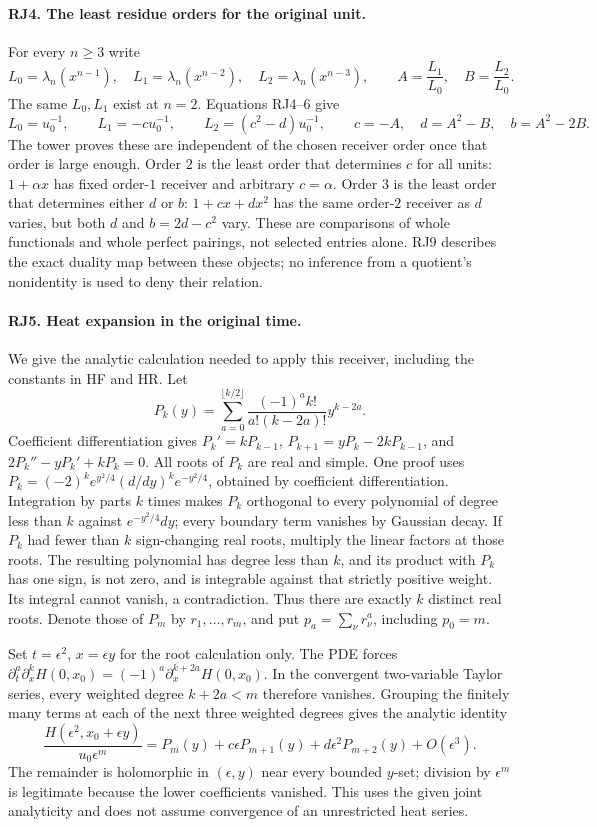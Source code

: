 \documentclass[11pt,a4paper]{article}
\theoremstyle{definition}\newtheorem{definition}[theorem]{Definition}
\begin{document}
\paragraph{RJ4. The least residue orders for the original unit.}
For every $n\ge3$ write
\[
 L_0=\lambda_n(x^{n-1}),\quad L_1=\lambda_n(x^{n-2}),\quad
 L_2=\lambda_n(x^{n-3}),\qquad A=\frac{L_1}{L_0},\quad
 B=\frac{L_2}{L_0}.
 \tag{RJ10}
\]
The same $L_0,L_1$ exist at $n=2$. Equations RJ4--6 give
\[
 L_0=u_0^{-1},\qquad L_1=-cu_0^{-1},\qquad
 L_2=(c^2-d)u_0^{-1},
 \qquad\boxed{c=-A,\quad d=A^2-B,\quad b=A^2-2B.}
 \tag{RJ11}
\]
The tower proves these are independent of the chosen receiver order
once that order is large enough. Order $2$ is the least order that
determines $c$ for all units: $1+\alpha x$ has fixed order-$1$
receiver and arbitrary $c=\alpha$. Order $3$ is the least order
that determines either $d$ or $b$: $1+c x+d x^2$ has the same
order-$2$ receiver as $d$ varies, but both $d$ and $b=2d-c^2$
vary. These are comparisons of whole functionals and whole perfect
pairings, not selected entries alone. RJ9 describes the exact
duality map between these objects; no inference from a quotient's
nonidentity is used to deny their relation.

\paragraph{RJ5. Heat expansion in the original time.}
We give the analytic calculation needed to apply this receiver,
including the constants in HF and HR. Let
\[
 P_k(y)=\sum_{a=0}^{\lfloor k/2\rfloor}
       \frac{(-1)^ak!}{a!(k-2a)!}y^{k-2a}.
 \tag{RJ12}
\]
Coefficient differentiation gives
$P_k'=kP_{k-1}$,
$P_{k+1}=yP_k-2kP_{k-1}$, and
$2P_k''-yP_k'+kP_k=0$.
All roots of $P_k$ are real and simple. One proof uses
$P_k=(-2)^ke^{y^2/4}(d/dy)^ke^{-y^2/4}$, obtained by coefficient
differentiation. Integration by parts $k$ times makes $P_k$
orthogonal to every polynomial of degree less than $k$ against
$e^{-y^2/4}dy$; every boundary term vanishes by Gaussian decay.
If $P_k$ had fewer than $k$ sign-changing real roots, multiply the
linear factors at those roots. The resulting polynomial has degree
less than $k$, and its product with $P_k$ has one sign, is not zero,
and is integrable against that strictly positive weight. Its integral
cannot vanish, a contradiction. Thus there are exactly $k$ distinct
real roots. Denote those of $P_m$ by $r_1,\ldots,r_m$, and put
$p_a=\sum_\nu r_\nu^a$, including $p_0=m$.

Set $t=\epsilon^2$, $x=\epsilon y$ for the root calculation only.
The PDE forces
$\partial_t^a\partial_x^kH(0,x_0)=(-1)^a
\partial_x^{k+2a}H(0,x_0)$.
In the convergent two-variable Taylor series, every weighted degree
$k+2a<m$ therefore vanishes. Grouping the finitely many terms at each
of the next three weighted degrees gives the analytic identity
\[
 \frac{H(\epsilon^2,x_0+\epsilon y)}{u_0\epsilon^m}
   =P_m(y)+c\epsilon P_{m+1}(y)
        +d\epsilon^2P_{m+2}(y)+O(\epsilon^3).
 \tag{RJ13}
\]
The remainder is holomorphic in $(\epsilon,y)$ near every bounded
$y$-set; division by $\epsilon^m$ is legitimate because the lower
coefficients vanished. This uses the given joint analyticity and
does not assume convergence of an unrestricted heat series.
\end{document}
